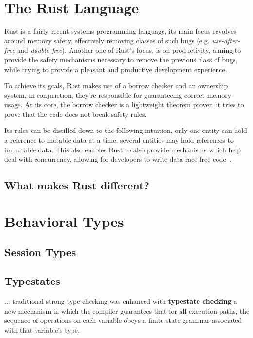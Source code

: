 \section{The Rust Language}\label{sec:rust-lang}

Rust is a fairly recent systems programming language,
its main focus revolves around memory safety,
effectively removing classes of such bugs (e.g. \emph{use-after-free} and \emph{double-free}).
Another one of Rust's focus, is on productivity,
aiming to provide the safety mechanisms necessary to remove the previous class of bugs,
while trying to provide a pleasant and productive development experience.

To achieve its goals, Rust makes use of a borrow checker and an ownership system,
in conjunction, they're responsible for guaranteeing correct memory usage.
At its core, the borrow checker is a lightweight theorem prover,
it tries to prove that the code does not break safety rules.

Its rules can be distilled down to the following intuition,
only one entity can hold a reference to mutable data at a time,
several entities may hold references to immutable data.
This also enables Rust to also provide mechanisms which help deal with concurrency,
allowing for developers to write data-race free
code~\autocite{Turon2015}.

\subsection{What makes Rust different?}

\section{Behavioral Types}\label{sec:behavioral-types}

\subsection{Session Types}


\subsection{Typestates}\label{sec:typestates}

\begin{displayquote}
    ... traditional strong type checking was enhanced with \textbf{typestate checking}
    a new mechanism in which the compiler guarantees that for all execution paths,
    the sequence of operations on each variable obeys a finite state grammar associated with that variable's type.
\end{displayquote}

